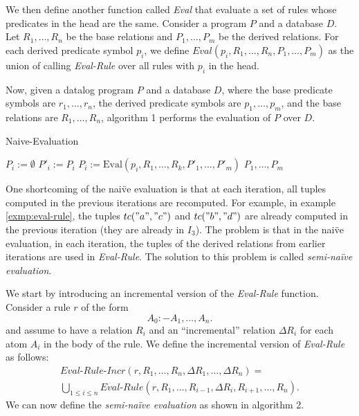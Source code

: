 \documentclass[twoside,11pt,openright]{report}
\theoremstyle{definition}
\begin{document}
We then define another function called \textit{Eval} that evaluate a set of rules whose predicates in the head are the same.
Consider a program $P$ and a database $D$. Let $R_1, \ldots, R_n$ be the base relations and $P_1, \ldots, P_m$ be the derived relations.
For each derived predicate symbol $p_i$, we define $Eval(p_i, R_1, \ldots, R_n, P_1, \ldots, P_m)$ as the union
of calling \textit{Eval-Rule} over all rules with $p_i$ in the head.

Now, given a datalog program $P$ and a database $D$, where the base predicate symbols are $r_1, \ldots, r_n$,
the derived predicate symbols are $p_1, \ldots, p_m$, and the base relations are $R_1, \ldots, R_n$,
algorithm 1 performs the evaluation of $P$ over $D$.

\begin{algorithm}
  \caption{Naive-Evaluation}
  \begin{algorithmic}[1] %
    \State $P_i := \emptyset$
    \EndFor
    \Repeat
    \State $P'_i := P_i$
    \EndFor
    \State $P_i := \text{Eval}(p_i, R_1, \ldots, R_k, P'_1, \ldots, P'_m)$
    \EndFor
    \State \Return $P_1, \ldots, P_m$
  \end{algorithmic}
\end{algorithm}
\label{alg:naive-eval}

One shortcoming of the nai\"ve evaluation is that at each iteration, all tuples computed in the previous
iterations are recomputed. For example, in example \ref{exmp:eval-rule}, the tuples $tc("a", "c")$ and $tc("b", "d")$
are already computed in the previous iteration (they are already in $I_3$). The problem is that in the nai\"ve evaluation,
in each iteration, the tuples of the derived relations from earlier iterations are used in \textit{Eval-Rule}.
The solution to this problem is called \textit{semi-na\"ive evaluation}.

We start by introducing an incremental version of the \textit{Eval-Rule} function. Consider a rule $r$ of the form
$$A_0 :- A_1, \ldots, A_n.$$
and assume to have a relation $R_i$ and an ``incremental'' relation $\Delta R_i$ for each atom $A_i$ in the body of the rule.
We define the incremental version of \textit{Eval-Rule} as follows:
\begin{equation*}
  \begin{split}
    \textit{Eval-Rule-Incr}(r, R_1, \ldots, R_n,  \Delta R_1, \ldots, \Delta R_n) = \\
    \bigcup_{1 \leq i \leq n} \textit{Eval-Rule}(r, R_1, \ldots, R_{i-1}, \Delta R_i, R_{i+1}, \ldots, R_n).
  \end{split}
\end{equation*}
We can now define the \textit{semi-na\"ive evaluation} as shown in algorithm 2.
\end{document}

